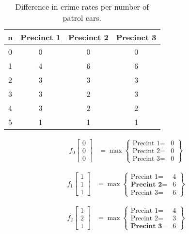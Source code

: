 \documentclass[a4paper,11pt]{article}
\begin{document}
\begin{table}[h]
\centering
\caption{Difference in crime rates per number of patrol cars.}
\begin{tabular}{c|ccc}
\hline
\textbf{n} & \textbf{Precinct 1} & \textbf{Precinct 2} & \textbf{Precinct 3} \\
\hline
0 &	0&	0&	0 \\
1&	4&	6&	6 \\
2&	3&	3&	3\\
3&	3&	2&	3\\
4&	3&	2&	2\\
5&	1&	1&	1\\
\hline
\end{tabular}
\end{table}

\begin{align}
	f_0\begin{bmatrix}
		0 \\ 0 \\ 0
	\end{bmatrix} &= \max 
	\begin{Bmatrix}
		\text{Precint 1}= & 0 \\
		\text{Precint 2}= & 0 \\
		\text{Precint 3}= & 0
	\end{Bmatrix}	
\end{align}

\begin{align}
	f_1\begin{bmatrix}
		1 \\ 1 \\ 1
	\end{bmatrix} &= \max 
	\begin{Bmatrix}
		\text{Precint 1}= & 4 \\
		\textbf{Precint 2}= & 6 \\
		\text{Precint 3}= & 6
	\end{Bmatrix}	
\end{align}

\begin{align}
	f_2\begin{bmatrix}
		1 \\ 2 \\ 1
	\end{bmatrix} &= \max 
	\begin{Bmatrix}
		\text{Precint 1}= & 4 \\
		\text{Precint 2}= & 3 \\
		\textbf{Precint 3}= & 6
	\end{Bmatrix}	
\end{align}
\end{document}
